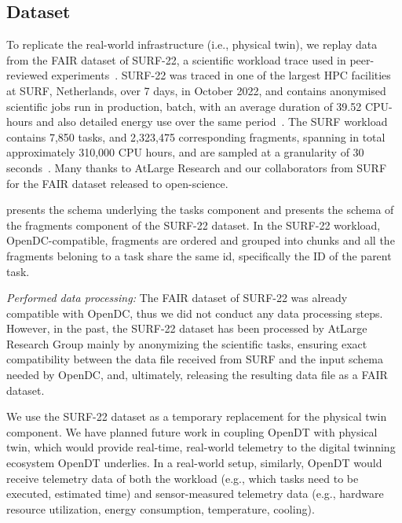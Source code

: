 \subsection{Dataset}\label{sec:dataset}

To replicate the real-world infrastructure (i.e., physical twin), we replay data from the FAIR dataset of SURF-22, a scientific workload trace used in peer-reviewed experiments~\cite{DBLP:conf/wosp/NiewenhuisTIM24, nicolae5377101m3sa}. SURF-22 was traced in one of the largest HPC facilities at SURF, Netherlands, over 7 days, in October 2022, and contains anonymised scientific jobs run in production, batch, with an average duration of 39.52 CPU-hours and also detailed energy use over the same period~\cite{nicolae5377101m3sa}. The SURF workload contains 7,850 tasks, and 2,323,475 corresponding fragments, spanning in total approximately 310,000 CPU hours, and are sampled at a granularity of 30 seconds~\cite{nicolae5377101m3sa}. Many thanks to AtLarge Research and our collaborators from SURF for the FAIR dataset released to open-science.

 presents the schema underlying the tasks component and  presents the schema of the fragments component of the SURF-22 dataset. In the SURF-22 workload, OpenDC-compatible, fragments are ordered and grouped into chunks and all the fragments beloning to a task share the same id, specifically the ID of the parent task.

\textit{Performed data processing:} The FAIR dataset of SURF-22 was already compatible with OpenDC, thus we did not conduct any data processing steps. However, in the past, the SURF-22 dataset has been processed by AtLarge Research Group mainly by anonymizing the scientific tasks, ensuring exact compatibility between the data file received from SURF and the input schema needed by OpenDC, and, ultimately, releasing the resulting data file as a FAIR dataset.

We use the SURF-22 dataset as a temporary replacement for the physical twin component. We have planned future work in coupling OpenDT with physical twin, which would provide real-time, real-world telemetry to the digital twinning ecosystem OpenDT underlies. In a real-world setup, similarly, OpenDT would receive telemetry data of both the workload (e.g., which tasks need to be executed, estimated time) and sensor-measured telemetry data (e.g., hardware resource utilization, energy consumption, temperature, cooling).


